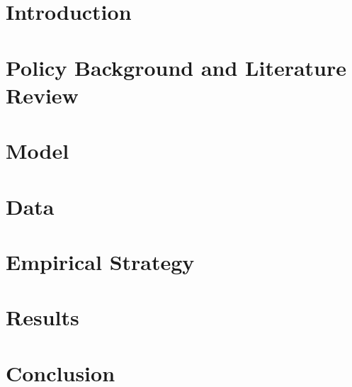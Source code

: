 \documentclass[12pt]{article}
\begin{document}
	
	
	\maketitle

\medskip

\thispagestyle{empty}

\clearpage

\onehalfspacing
\setcounter{footnote}{0}
\renewcommand{\thefootnote}{\arabic{footnote}}
\setcounter{page}{1}

\doublespacing
\setcounter{footnote}{0}
\renewcommand{\thefootnote}{\arabic{footnote}}
\setcounter{page}{1}

\doublespacing

\section{Introduction} \label{introduction}


\section{Policy Background and Literature Review} \label{policy_background}


\section{Model} \label{model}


\section{Data} \label{data}


\section{Empirical Strategy} \label{empirical_strategy}


\section{Results} \label{results}


\section{Conclusion} \label{conclusion}



\clearpage

\singlespacing





\newpage 

\end{document}
